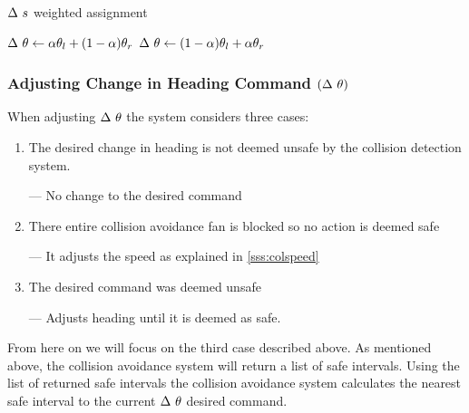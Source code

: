 \documentclass[bsc,frontabs,twoside,singlespacing,parskip,deptreport]{infthesis}     %
\begin{document}
\begin{algorithm}
\caption{$\Delta~s$ weighted assignment}
\begin{algorithmic}
\STATE $\Delta~\theta \leftarrow \alpha\theta_{l} + (1-\alpha)\theta_{r}$
\ELSE
\STATE $\Delta~\theta \leftarrow (1-\alpha)\theta_{l} + \alpha\theta_{r}$
\ENDIF
\end{algorithmic}
\end{algorithm}

\subsubsection{Adjusting Change in Heading Command $(\Delta~\theta)$}
\label{sss:colheading}
When adjusting  $\Delta~\theta$ the system considers three cases:
\begin{enumerate}
    \item The desired change in heading is not deemed unsafe by the collision detection system. 
    
    \hspace{24pt}--- No change to the desired command
    
    \item There entire collision avoidance fan is blocked so no action is deemed safe 
    
    \hspace{24pt}--- It adjusts the speed as explained in \ref{sss:colspeed}

    \item The desired command was deemed unsafe 
    
    \hspace{24pt}--- Adjusts heading until it is deemed as safe.
\end{enumerate}
	
From here on we will focus on the third case described above. As mentioned above, the collision avoidance system will return a list of safe intervals. Using the list of returned safe intervals the collision avoidance system calculates the nearest safe interval to the current $\Delta~\theta$ desired command. 
\end{document}
